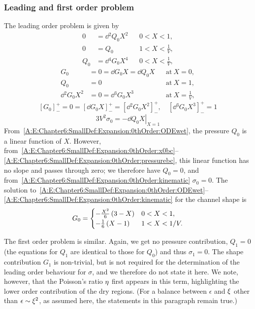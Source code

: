 \begin{subappendices}
\subsubsection{Leading and first order problem}
The leading order problem is given by
\begin{align}
0&= \dd{^2Q_0}{X^2} & &0 < X<1,\label{A:E:Chapter6:SmallDef:Expansion:0thOrder:ODEwet}\\
0&= Q_0  & &1 < X< \frac{1}{V},\\
Q_0 &= \dd{^4 G_0}{X^4} & & 0 < X < \frac{1}{V},
\end{align}
\begin{align}
G_0 &= 0 = \dd{G_0}{X}= \dd{Q_0}{X} & &\text{at}~X = 0,\label{A:E:Chapter6:SmallDef:Expansion:0thOrder:x0bc}\\
Q_0 &=0 & &\text{at}~X = 1,\label{A:E:Chapter6:SmallDef:Expansion:0thOrder:pressurebc}\\
\dd{^2 G_0}{X^2} &=0 = \dd{^3 G_0}{X^3} & &\text{at}~X = \frac{1}{V},
\end{align}
\begin{equation}
\left[G_0\right]_-^+ =0 = \left[\dd{G_0}{X}\right]_-^+ = \left[\dd{^2 G_0}{X^2}\right]_-^+, \quad  \left[\dd{^3 G_0}{X^3}\right]_-^+ = 1
\end{equation}
\begin{equation}\label{A:E:Chapter6:SmallDef:Expansion:0thOrder:kinematic}
3V^2 \sigma_0 = -\left.\dd{Q_0}{X}\right|_{X=1}
\end{equation}
From~\eqref{A:E:Chapter6:SmallDef:Expansion:0thOrder:ODEwet},  the pressure $Q_0$ is a linear function of $X$. However, from~\eqref{A:E:Chapter6:SmallDef:Expansion:0thOrder:x0bc}--\eqref{A:E:Chapter6:SmallDef:Expansion:0thOrder:pressurebc}, this linear function has no slope and passes through zero; we therefore have $Q_0 = 0$, and from~\eqref{A:E:Chapter6:SmallDef:Expansion:0thOrder:kinematic} $\sigma_0 = 0$. The solution to~\eqref{A:E:Chapter6:SmallDef:Expansion:0thOrder:ODEwet}--\eqref{A:E:Chapter6:SmallDef:Expansion:0thOrder:kinematic} for the channel shape is
\begin{equation}\label{A:E:Chapter6:SmallDef:Expansion:0thOrder:shape_sol}
G_0 = \begin{cases}
-\frac{X^2}{6}\left(3-X\right) & 0 < X < 1,\\
-\frac{1}{6}\left(X-1\right) & 1< X < 1/V.
\end{cases}
\end{equation}

The first order problem is similar. Again, we get no pressure contribution, $Q_1 = 0$ (the equations for $Q_1$ are identical to those for $Q_0$) and thus $\sigma_1 = 0$. The shape contribution $G_1$ is non-trivial, but is not required for the determination of the leading order behaviour for $\sigma$, and we therefore do not state it here. We note, however, that the Poisson's ratio $\eta$ first appears in this term, highlighting the lower order contribution of the dry regions. (For a balance between $\epsilon$ and $\xi$ other than $\epsilon \sim \xi^2$, as assumed here, the  statements in this paragraph remain true.)


\end{subappendices}

